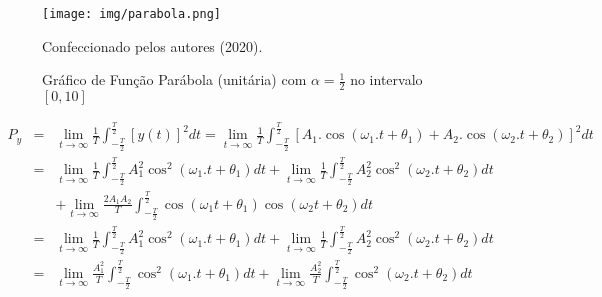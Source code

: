 
\begin{figure}[!h]
    \centering
    \texttt{[image: img/parabola.png]}
    \caption{Gráfico de Função Parábola (unitária) com $\alpha = \frac{1}{2}$ no intervalo $[0,10]$}
    \label{fig:rampa}
    \begin{flushright}
        Confeccionado pelos autores (2020).
    \end{flushright}
\end{figure} 


\begin{eqnarray*} \label{eq:py}
    P_y &=& \lim_{t\to\infty} \frac{1}{T} \int_{-\frac{T}{2}}^{\frac{T}{2}} [y(t)]^2 dt = \lim_{t\to\infty} \frac{1}{T} \int_{-\frac{T}{2}}^{\frac{T}{2}} [A_1.\cos{(\omega_1.t + \theta_1)}+A_2.\cos{(\omega_2.t + \theta_2)}]^2 dt \\
     &=& \lim_{t\to\infty} \frac{1}{T} \int_{-\frac{T}{2}}^{\frac{T}{2}} A_1^2 \cos^2(\omega_1.t+\theta_1) dt + \lim_{t\to\infty} \frac{1}{T} \int_{-\frac{T}{2}}^{\frac{T}{2}} A_2^2 \cos^2(\omega_2.t+\theta_2) dt \\
    && + \lim_{t\to\infty} \frac{2A_1A_2}{T} \int_{-\frac{T}{2}}^{\frac{T}{2}}  \cos(\omega_1t+\theta_1) \cos(\omega_2t + \theta_2) dt \\
     &=& \lim_{t\to\infty} \frac{1}{T} \int_{-\frac{T}{2}}^{\frac{T}{2}} A_1^2 \cos^2(\omega_1.t+\theta_1) dt + \lim_{t\to\infty} \frac{1}{T} \int_{-\frac{T}{2}}^{\frac{T}{2}} A_2^2 \cos^2(\omega_2.t+\theta_2) dt \\
    &=& \lim_{t\to\infty} \frac{A_1^2}{T} \int_{-\frac{T}{2}}^{\frac{T}{2}} \cos^2(\omega_1.t+\theta_1) dt + \lim_{t\to\infty} \frac{A_2^2}{T} \int_{-\frac{T}{2}}^{\frac{T}{2}} \cos^2(\omega_2.t+\theta_2) dt 
\end{eqnarray*}

\begin{lstlisting}[language=Octave]


\end{lstlisting}


\usepackage{listings}           %


\lstset{style=default}

